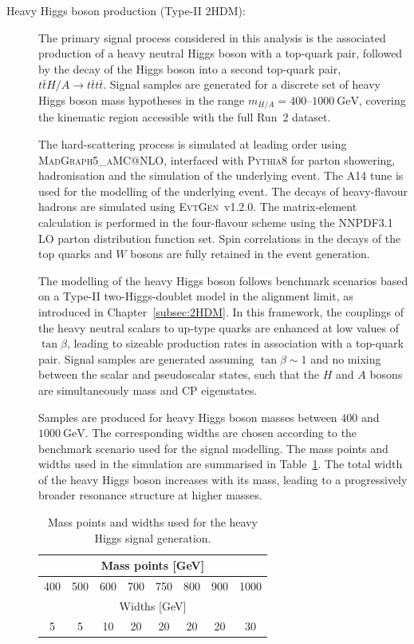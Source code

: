\begin{description}

\item[Heavy Higgs boson production (Type-II 2HDM):]

The primary signal process considered in this analysis is the associated production
of a heavy neutral Higgs boson with a top-quark pair, followed by the decay of the Higgs boson
into a second top-quark pair,
$t\bar{t}H/A \rightarrow t\bar{t}t\bar{t}$.
Signal samples are generated for a discrete set of heavy Higgs boson mass hypotheses
in the range $m_{H/A}=400$--$1000~\mathrm{GeV}$, covering the kinematic region
accessible with the full Run~2 dataset.

The hard-scattering process is simulated at leading order using
\textsc{MadGraph5\_aMC@NLO}, interfaced with \textsc{Pythia8}
for parton showering, hadronisation and the simulation of the underlying event.
The A14 tune is used for the modelling of the underlying event.
The decays of heavy-flavour hadrons are simulated using
\textsc{EvtGen}~v1.2.0.
The matrix-element calculation is performed in the four-flavour scheme
using the NNPDF3.1 LO parton distribution function set.
Spin correlations in the decays of the top quarks and $W$ bosons
are fully retained in the event generation.

The modelling of the heavy Higgs boson follows benchmark scenarios based on
a Type-II two-Higgs-doublet model in the alignment limit, as introduced in Chapter~\ref{subsec:2HDM}.
In this framework, the couplings of the heavy neutral scalars to up-type quarks
are enhanced at low values of $\tan\beta$,
leading to sizeable production rates in association with a top-quark pair.
Signal samples are generated assuming $\tan\beta \sim 1$
and no mixing between the scalar and pseudoscalar states,
such that the $H$ and $A$ bosons are simultaneously mass and CP eigenstates.

Samples are produced for heavy Higgs boson masses between
$400$ and $1000~\mathrm{GeV}$.
The corresponding widths are chosen according to the benchmark scenario
used for the signal modelling.
The mass points and widths used in the simulation are summarised in
Table~\ref{tab:MassWidth}.
The total width of the heavy Higgs boson increases with its mass,
leading to a progressively broader resonance structure at higher masses.

\begin{table}[!ht]
  \begin{center}\small
    \begin{tabular}{|cccccccc|}
       \hline
       \multicolumn{8}{|c|}{Mass points [GeV]}\\
        \hline
       400& 500& 600& 700& 750& 800& 900& 1000\\
       \hline   
       \hline
       \multicolumn{8}{|c|}{Widths [GeV]}\\
        \hline
       5& 5& 10& 20& 20& 20& 20& 30\\
       \hline   
    \end{tabular}
    \caption{Mass points and widths used for the heavy Higgs signal generation.}
    \label{tab:MassWidth}
  \end{center}
\end{table}


\end{description}
